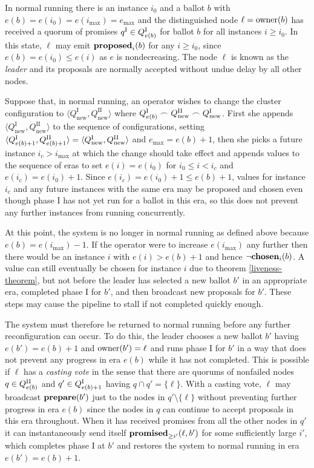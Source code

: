 \documentclass[journal]{IEEEtran}
\begin{document}
In normal running there is an instance $i_0$ and a ballot $b$ with ${e(b) =
e(i_0) = e(i_\mathrm{max}) = e_\mathrm{max}}$ and the distinguished node $\ell
= \mathrm{owner}(b)$ has received a quorum of promises $q^\textrm{I} \in {Q}^\textrm{I}_{e(b)}$ for
ballot $b$ for all instances $i \ge i_0$. In this state, $\ell$ may emit
$\mathbf{proposed}_{i}(b)$ for any $i \ge i_0$, since $e(b) = e(i_0) \le e(i)$ as $e$ is
nondecreasing.  The node $\ell$ is known as the \textit{leader} and its
proposals are normally accepted without undue delay by all other nodes.

\def\Qnew#1{Q^\textrm{#1}_\textrm{new}}

Suppose that, in normal running, an operator wishes to change the cluster
configuration to $\langle \Qnew{I}, \Qnew{II} \rangle$ where $\QI{e(b)} \frown
\Qnew{II} \frown \Qnew{I}$. First she appends $\langle \Qnew{I}, \Qnew{II}
\rangle$ to the sequence of configurations, setting $\langle \QI{e(b)+1},
\QII{e(b)+1} \rangle = \langle \Qnew{I}, \Qnew{II} \rangle$ and $e_\mathrm{max}
= e(b) + 1$, then she picks a future instance $i_c > i_\mathrm{max}$ at which
the change should take effect and appends values to the sequence of eras to set
$e(i) = e(i_0)$ for $i_0 \le i < i_c$ and $e(i_c) = e(i_0) + 1$.  Since $e(i_c)
= e(i_0) + 1 \le e(b) + 1$, values for instance $i_c$ and any future instances
with the same era may be proposed and chosen even though phase I has not yet
run for a ballot in this era, so this does not prevent any further instances
from running concurrently.

At this point, the system is no longer in normal running as defined above
because $e(b) = e(i_\mathrm{max}) - 1$. If the operator were to increase
$e(i_\mathrm{max})$ any further then there would be an instance $i$ with $e(i)
> e(b) + 1$ and hence $\neg\mathbf{chosen}_{i}(b)$. A value can still eventually be
chosen for instance $i$ due to theorem \ref{liveness-theorem}, but not before
the leader has selected a new ballot $b'$ in an appropriate era, completed
phase I for $b'$, and then broadcast new proposals for $b'$. These steps may
cause the pipeline to stall if not completed quickly enough.

The system must therefore be returned to normal running before any further
reconfiguration can occur. To do this, the leader chooses a new ballot $b'$
having $e(b') = e(b) + 1$ and $\mathrm{owner}(b') = \ell$ and runs phase I for $b'$ in
a way that does not prevent any progress in era $e(b)$ while it has not
completed. This is possible if $\ell$ has a \textit{casting vote} in the sense
that there are quorums of nonfailed nodes $q \in {Q}^\textrm{II}_{e(b)}$ and $q' \in
{Q}^\textrm{I}_{e(b)+1}$ having $q \cap q' = \{\ell\}$. With a casting vote, $\ell$ may
broadcast $\mathbf{prepare}(b')$ just to the nodes in $q' \setminus \{\ell\}$ without
preventing further progress in era $e(b)$ since the nodes in $q$ can continue
to accept proposals in this era throughout.  When it has received promises from
all the other nodes in $q'$ it can instantaneously send itself
$\mathbf{promised}_{\ge i'}(\ell,b')$ for some sufficiently large $i'$, which completes phase
I at $b'$ and restores the system to normal running in era $e(b') = e(b)+1$.
\end{document}
